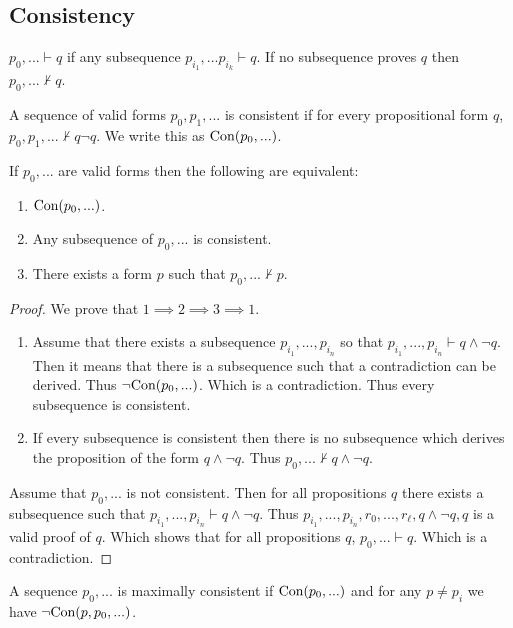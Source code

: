\subsection{Consistency}
\begin{notation}
  $p_0,... \vdash q$ if any subsequence $p_{i_1},...p_{i_k} \vdash q$. If no subsequence proves $q$ then $p_0,... \nvdash q$.
\end{notation}
\begin{definition}
  A sequence of valid forms $p_0,p_1,...$ is consistent if for every propositional form $q$, $p_0,p_1,... \nvdash q\lnot q$. We write this as $\text{Con}(p_0,...)$.
\end{definition}
\begin{theorem}
  If $p_0,...$ are valid forms then the following are equivalent:
  \begin{enumerate}
    \item $\text{Con}(p_0,...)$.
    \item Any subsequence of $p_0,...$ is consistent.
    \item There exists a form $p$ such that $p_0,...\nvdash p$.
  \end{enumerate}
\end{theorem}
\begin{proof}
  We prove that $1\implies 2 \implies 3 \implies 1$.
  \begin{enumerate}
    \item Assume that there exists a subsequence $p_{i_1},...,p_{i_n}$ so that $p_{i_1},...,p_{i_n}\vdash q\land \lnot q$. Then it means that there is a subsequence such that a contradiction can be derived. Thus $\lnot \text{Con}(p_0,...)$. Which is a contradiction. Thus every subsequence is consistent.
    \item If every subsequence is consistent then there is no subsequence which derives the proposition of the form $q\land \lnot q$. Thus $p_0,... \nvdash q\land \lnot q$.
  \end{enumerate}
\item Assume that $p_0,...$ is not consistent. Then for all propositions $q$ there exists a subsequence such that $p_{i_1},...,p_{i_n} \vdash q\land \lnot q$. Thus $p_{i_1},...,p_{i_n}, r_0,...,r_\ell, q\land \lnot q, q$ is a valid proof of $q$. Which shows that for all propositions $q$, $p_0,... \vdash q$. Which is a contradiction.
\end{proof}
\begin{definition}
  A sequence $p_0,...$ is maximally consistent if $\text{Con}(p_0,...)$ and for any $p \neq p_i$ we have $\lnot \text{Con}(p,p_0,...)$.
\end{definition}
